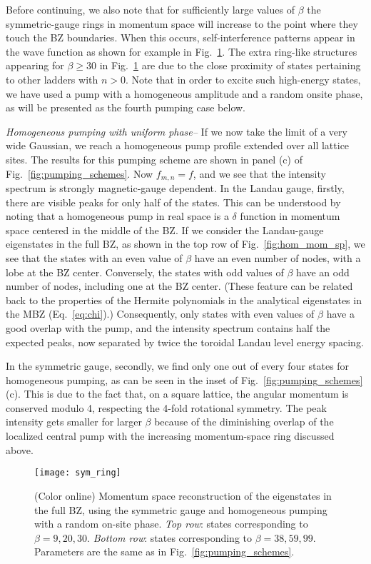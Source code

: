 \documentclass[twocolumn, 10pt, aps, superscriptaddress, floatfix, showpacs, pra, citeautoscript]{revtex4-1}
\begin{document}
Before continuing, we also note that for sufficiently large values of $\beta$ the symmetric-gauge rings in momentum space will increase to the point where they touch the BZ boundaries. When this occurs, self-interference patterns appear in the wave function as shown for example in Fig.~\ref{fig:torus_edge}. The extra ring-like structures appearing for $\beta \geq 30$ in Fig.~\ref{fig:torus_edge} are due to the close proximity of states pertaining to other ladders with
$n >0$. Note that in order to excite such high-energy states, we have used a pump with a homogeneous amplitude and a random onsite phase, as will be presented as the fourth pumping case below. 

{\em{Homogeneous pumping with uniform phase--}} If we now take the limit of a very wide Gaussian, we reach a homogeneous pump profile extended over all lattice sites. The results for this pumping scheme are shown in panel (c) of
Fig.~\ref{fig:pumping_schemes}. Now $f_{m,n} = f$, and we see that the intensity spectrum is strongly magnetic-gauge dependent. In the Landau gauge, firstly, there are visible peaks for only
half of the states. This can be understood by noting that a homogeneous pump in real space is a $\delta$ function in momentum space centered in the
middle of the BZ. If we consider the Landau-gauge eigenstates in the full BZ, as shown
in the top row of Fig.~\ref{fig:hom_mom_sp}, we see that the states with an even
value of $\beta$ have an even number of nodes, with a lobe at the BZ
center. Conversely, the states with odd values of $\beta$ have an odd number of nodes, including one at the BZ center. (These feature can be related back to the properties of the Hermite polynomials in the analytical eigenstates in the MBZ (Eq.~\eqref{eq:chi}).) Consequently, only states with even values of $\beta$ have a good overlap with the pump, and the intensity spectrum contains half the expected peaks, now separated by twice the toroidal Landau level energy spacing.  

In the symmetric gauge, secondly, we find only one out of every four
states for homogeneous pumping, as can be seen in the inset of Fig.~\ref{fig:pumping_schemes}
(c). This is due to the fact that, on a square lattice, the angular
momentum is conserved modulo 4, respecting the 4-fold rotational
symmetry. The peak intensity gets smaller for larger $\beta$ because
of the diminishing overlap of the localized central pump with the
increasing momentum-space ring discussed above.

\begin{figure}[tb]
  \centering
  \texttt{[image: sym\_ring]} %
  \caption{(Color online) Momentum space reconstruction of the eigenstates in the
    full BZ, using the symmetric gauge and homogeneous pumping with a random on-site
    phase. \emph{Top row}: states corresponding to
    $\beta = 9, 20, 30$.  \emph{Bottom row}: states corresponding to
    $\beta = 38, 59, 99$. Parameters are the same as in Fig.~\ref{fig:pumping_schemes}.}
  \label{fig:torus_edge}
\end{figure}
\end{document}
